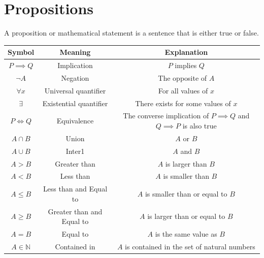 \documentclass{book}
\begin{document}
\section{Propositions}
A proposition or mathematical statement is a sentence that is either true or false.
\begin{center}
	\begin{tabular}{c|c|c}
		Symbol                & Meaning                   & Explanation                                                                \\ \hline
		$P \implies Q$        & Implication               & $P$ implies $Q$                                                            \\
		$\lnot A$             & Negation                  & The opposite of $A$                                                        \\
		$\forall x$           & Universal quantifier      & For all values of $x$                                                      \\
		$\exists $            & Existential quantifier    & There exists for some values of $x$                                        \\
		$P \Leftrightarrow Q$ & Equivalence               & The converse implication of $P \implies Q$ and $Q \implies P$ is also true \\
		$A \cap B$            & Union                     & $A$ or $B$                                                                 \\
		$A \cup B$            & Inter1                    & $A$ and $B$                                                                \\
		$A > B$               & Greater than              & $A$ is larger than $B$                                                     \\
		$A < B$               & Less than                 & $A$ is smaller than $B$                                                    \\
		$A \leq B$            & Less than and Equal to    & $A$ is smaller than or equal to $B$                                        \\
		$A \geq B$            & Greater than and Equal to & $A$ is larger than or equal to $B$                                         \\
		$A = B$               & Equal to                  & $A$ is the same value as $B$                                               \\
		$A \in \mathbb{N}$    & Contained in              & $A$ is contained in the set of natural numbers                             \\
	\end{tabular}
\end{center}
\end{document}
